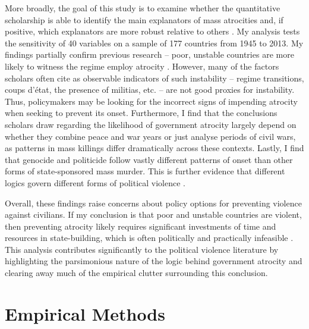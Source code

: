 \documentclass[a4paper,12pt]{article}
\begin{document}
More broadly, the goal of this study is to examine whether the quantitative scholarship is able to identify the main explanators of mass atrocities and, if positive, which explanators are more robust relative to others \citep[2]{bell2015examining}. My analysis tests the sensitivity of 40 variables on a sample of 177 countries from 1945 to 2013. My findings partially confirm previous research -- poor, unstable countries are more likely to witness the regime employ atrocity \citep[e.g.,][]{goldsmith2013forecasting,harff2003no,krain1997state}. However, many of the factors scholars often cite as observable indicators of such instability -- regime transitions, coups d'état, the presence of militias, etc. -- are not good proxies for instability. Thus, policymakers may be looking for the incorrect signs of impending atrocity when seeking to prevent its onset. Furthermore, I find that the conclusions scholars draw regarding the likelihood of government atrocity largely depend on whether they combine peace and war years or just analyse periods of civil wars, as patterns in mass killings differ dramatically across these contexts. Lastly, I find that genocide and politicide follow vastly different patterns of onset than other forms of state-sponsored mass murder. This is further evidence that different logics govern different forms of political violence \citep{stanton2013terrorism}.

Overall, these findings raise concerns about policy options for preventing violence against civilians. If my conclusion is that poor and unstable countries are violent, then preventing atrocity likely requires significant investments of time and resources in state-building, which is often politically and practically infeasible \citep{doyle2006making}.  This analysis contributes significantly to the political violence literature by highlighting the parsimonious nature of the logic behind government atrocity and clearing away much of the empirical clutter surrounding this conclusion. 
	
\section{Empirical Methods}
\label{sec:methods}
	
\end{document}
